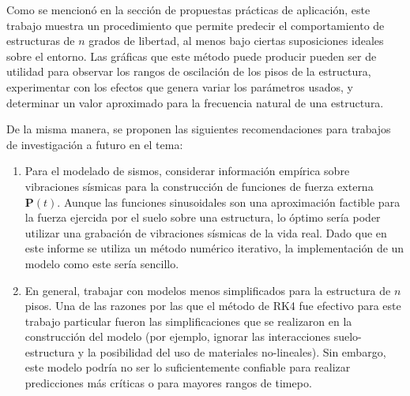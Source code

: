 Como se mencionó en la sección de propuestas prácticas de aplicación, este trabajo muestra un procedimiento que permite predecir el comportamiento de estructuras de \(n\) grados de libertad, al menos bajo ciertas suposiciones ideales sobre el entorno. Las gráficas que este método puede producir pueden ser de utilidad para observar los rangos de oscilación de los pisos de la estructura, experimentar con los efectos que genera variar los parámetros usados, y determinar un valor aproximado para la frecuencia natural de una estructura.

De la misma manera, se proponen las siguientes recomendaciones para trabajos de investigación a futuro en el tema:

\begin{enumerate}
    \item Para el modelado de sismos, considerar información empírica sobre vibraciones sísmicas para la construcción de funciones de fuerza externa \(\mathbf{P}(t)\). Aunque las funciones sinusoidales son una aproximación factible para la fuerza ejercida por el suelo sobre una estructura, lo óptimo sería poder utilizar una grabación de vibraciones sísmicas de la vida real. Dado que en este informe se utiliza un método numérico iterativo, la implementación de un modelo como este sería sencillo.

    \item En general, trabajar con modelos menos simplificados para la estructura de \(n\) pisos. Una de las razones por las que el método de RK4 fue efectivo para este trabajo particular fueron las simplificaciones que se realizaron en la construcción del modelo (por ejemplo, ignorar las interacciones suelo-estructura y la posibilidad del uso de materiales no-lineales). Sin embargo, este modelo podría no ser lo suficientemente confiable para realizar predicciones más críticas o para mayores rangos de timepo.
\end{enumerate}
